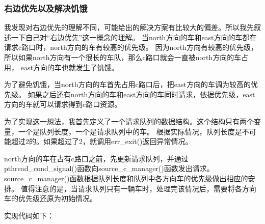 \documentclass[a4paper,left=2.5cm,right=2.5cm,11pt]{article}
\begin{document}
\subsubsection{右边优先以及解决饥饿}
	我发现对右边优先的理解不同，可能给出的解决方案有比较大的偏差。所以我先叙述一下自己对“右边优先”这一概念的理解。
	当north方向的车和east方向的车都在请求c路口时，north方向的车有较高的优先级。
	因为north方向有较高的优先级，所以如果north方向有一个很长的车队，那么c路口就会一直被north方向的车占用，
	east方向的车也就发生了饥饿。\par
	为了避免饥饿，当north方向的车首先占用c路口后，把east方向的车调为较高的优先级。
	如果之后还有north方向的车和east方向的车同时请求，依据优先级，east方向的车就可以请求得到c路口资源。\par
	为了实现这一想法，我首先定义了一个请求队列的数据结构。这个结构只有两个变量，一个是队列长度，一个是请求队列中的车。
	根据实际情况，队列长度是不可能超过2的。如果超过了2，就调用err\_exit()返回异常情况。\par
	north方向的车在占有c路口之前，先更新请求队列，并通过pthread\_cond\_signal()函数向source\_c\_manager()函数发出请求。
	source\_c\_manager()函数根据队列长度和队列中各方向车的优先级做出相应的安排。
	值得注意的是，当请求队列只有一辆车时，处理完该情况后，需要将各方向车的优先级还原为初始情况。\par
	实现代码如下：
\end{document}
